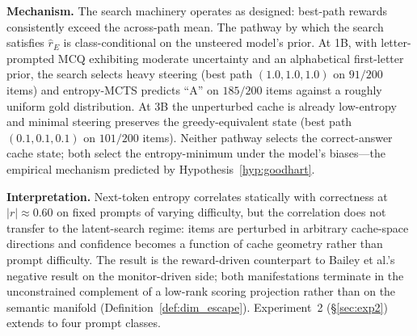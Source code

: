 \documentclass{article}
\begin{document}
\textbf{Mechanism.} The search machinery operates as designed: best-path rewards consistently exceed the across-path mean. The pathway by which the search satisfies $\hat{r}_E$ is class-conditional on the unsteered model's prior. At 1B, with letter-prompted MCQ exhibiting moderate uncertainty and an alphabetical first-letter prior, the search selects heavy steering (best path $(1.0,1.0,1.0)$ on $91/200$ items) and entropy-MCTS predicts ``A'' on $185/200$ items against a roughly uniform gold distribution. At 3B the unperturbed cache is already low-entropy and minimal steering preserves the greedy-equivalent state (best path $(0.1,0.1,0.1)$ on $101/200$ items). Neither pathway selects the correct-answer cache state; both select the entropy-minimum under the model's biases---the empirical mechanism predicted by Hypothesis~\ref{hyp:goodhart}.

\textbf{Interpretation.} Next-token entropy correlates statically with correctness at $|r| \approx 0.60$ on fixed prompts of varying difficulty, but the correlation does not transfer to the latent-search regime: items are perturbed in arbitrary cache-space directions and confidence becomes a function of cache geometry rather than prompt difficulty. The result is the reward-driven counterpart to Bailey et al.'s~\cite{bailey2024obfuscated} negative result on the monitor-driven side; both manifestations terminate in the unconstrained complement of a low-rank scoring projection rather than on the semantic manifold (Definition~\ref{def:dim_escape}). Experiment~2 (§\ref{sec:exp2}) extends to four prompt classes.
\end{document}
